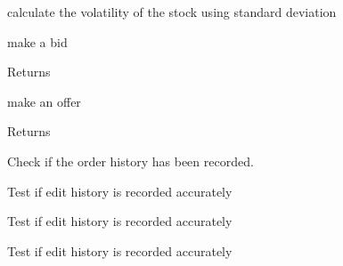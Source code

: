 \begin{DoxyRefList}
\item[\label{todo__todo000006}%
\hypertarget{todo__todo000006}{}%
Member \hyperlink{classfinancialmarketsimulator_1_1market_1_1_market_entry_attempt_book_a0f44f4bd495ffe46a145b968b3ec7e04}{financialmarketsimulator.market.Market\+Entry\+Attempt\+Book.get\+Volatility} ()]calculate the volatility of the stock using standard deviation  
\item[\label{todo__todo000008}%
\hypertarget{todo__todo000008}{}%
Member \hyperlink{classfinancialmarketsimulator_1_1market_1_1_market_strategy_a8477d0e77069f8583c4436f346930c71}{financialmarketsimulator.market.Market\+Strategy.make\+Bid} ()]make a bid \begin{DoxyReturn}{Returns}

\end{DoxyReturn}

\item[\label{todo__todo000007}%
\hypertarget{todo__todo000007}{}%
Member \hyperlink{classfinancialmarketsimulator_1_1market_1_1_market_strategy_a1a522f7af689168df4d3aa69afbb0aaa}{financialmarketsimulator.market.Market\+Strategy.make\+Offer} ()]make an offer \begin{DoxyReturn}{Returns}

\end{DoxyReturn}

\item[\label{todo__todo000009}%
\hypertarget{todo__todo000009}{}%
Member \hyperlink{class_stock_manager_unit_test_a528bc81dce5ad77cc63822b7f1df9409}{Stock\+Manager\+Unit\+Test.accept\+Order\+Test} ()]Check if the order history has been recorded.  
\item[\label{todo__todo000012}%
\hypertarget{todo__todo000012}{}%
Member \hyperlink{class_stock_manager_unit_test_aea75707233ddc04a4cc197fde0f1dc57}{Stock\+Manager\+Unit\+Test.edit\+Order\+Price\+And\+Shares\+Test} ()]Test if edit history is recorded accurately  
\item[\label{todo__todo000010}%
\hypertarget{todo__todo000010}{}%
Member \hyperlink{class_stock_manager_unit_test_a032966cac989c0957d0892ecc36e044c}{Stock\+Manager\+Unit\+Test.edit\+Order\+Price\+Test} ()]Test if edit history is recorded accurately  
\item[\label{todo__todo000011}%
\hypertarget{todo__todo000011}{}%
Member \hyperlink{class_stock_manager_unit_test_acc4a5199c1125e57cdac3af21609e036}{Stock\+Manager\+Unit\+Test.edit\+Order\+Shares\+Test} ()]Test if edit history is recorded accurately  
\item[\label{todo__todo000013}%
\hypertarget{todo__todo000013}{}%
Member \hyperlink{class_stock_manager_unit_test_a0ae4e7ac78f29c3f1d3a8a36571bccd3}{Stock\+Manager\+Unit\+Test.get\+Market\+Snap\+Shot\+Test} ()]
\end{DoxyRefList}